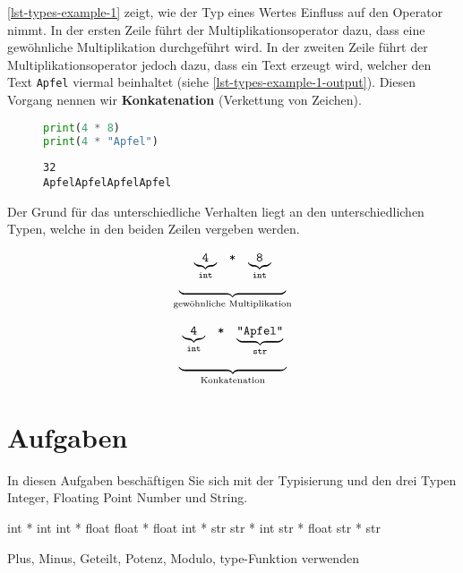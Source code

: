 \begin{example}

\autoref{lst-types-example-1} zeigt, wie der Typ eines Wertes Einfluss auf den Operator nimmt. In der ersten Zeile führt der Multiplikationsoperator dazu, dass eine gewöhnliche Multiplikation durchgeführt wird. In der zweiten Zeile führt der Multiplikationsoperator jedoch dazu, dass ein Text erzeugt wird, welcher den Text \lstinline{Apfel} viermal beinhaltet (siehe \autoref{lst-types-example-1-output}). Diesen Vorgang nennen wir \textbf{Konkatenation} (Verkettung von Zeichen).

\begin{figure}[htb]
\begin{minipage}{0.45\textwidth}
\begin{lstlisting}[language=python, label={lst-types-example-1}, caption={Beide Zeilen verwenden den Multiplikationsoperator.}]
print(4 * 8)
print(4 * "Apfel")
\end{lstlisting}
\end{minipage}
\hfill
\begin{minipage}{0.45\textwidth}
\begin{lstlisting}[language=output, label={lst-types-example-1-output}, caption={Gewöhnliche Multiplikation und Konkatenation des Texts.}]
32
ApfelApfelApfelApfel
\end{lstlisting}
\end{minipage}
\end{figure}

Der Grund für das unterschiedliche Verhalten liegt an den unterschiedlichen Typen, welche in den beiden Zeilen vergeben werden.

\begin{minipage}{0.45\textwidth}
$$
\begin{array}[t]{c}
\begin{array}[t]{ccc}
\underbrace{\texttt{4}}_{\texttt{int}} & \texttt{*} & \underbrace{\texttt{8}}_{\texttt{int}}
\end{array} \\
\underbrace{\hspace{3cm}}_{\textrm{gewöhnliche Multiplikation}}
\end{array}
$$
\end{minipage}
\begin{minipage}{0.45\textwidth}
$$
\begin{array}[t]{c}
\begin{array}[t]{ccc}
\underbrace{\texttt{4}}_{\texttt{int}} & \texttt{*} & \underbrace{\texttt{``Apfel``}}_{\texttt{str}}
\end{array} \\
\underbrace{\hspace{3cm}}_{\textrm{Konkatenation}}
\end{array}
$$
\end{minipage}

\end{example}

\section{Aufgaben}

In diesen Aufgaben beschäftigen Sie sich mit der Typisierung und den drei Typen Integer, Floating Point Number und String.

int * int
int * float
float * float
int * str
str * int
str * float
str * str

Plus, Minus, Geteilt, Potenz, Modulo, type-Funktion verwenden
